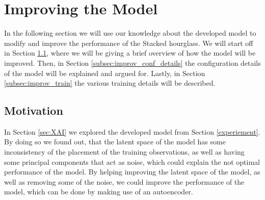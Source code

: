 \documentclass[./main.tex]{subfiles}
\begin{document}
\section{Improving the Model}\label{sec:improving}
In the following section we will use our knowledge about the developed model to modify and improve the performance of the Stacked hourglass. We will start off in Section \ref{subsec:improv_motivation}, where we will be giving a brief overview of how the model will be improved. Then, in Section \ref{subsec:improv_conf_details} the configuration details of the model will be explained and argued for. Lastly, in Section \ref{subsec:improv_train} the various training details will be described.

\subsection{Motivation}\label{subsec:improv_motivation}
In Section \ref{sec:XAI} we explored the developed model from Section \ref{experiement}. By doing so we found out, that the latent space of the model has some inconsistency of the placement of the training observations, as well as having some principal components that act as noise, which could explain the not optimal performance of the model. By helping improving the latent space of the model, as well as removing some of the noise, we could improve the performance of the model, which can be done by making use of an autoencoder.
\end{document}
